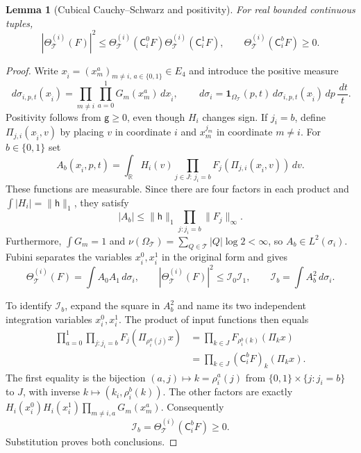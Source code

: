 \documentclass[12pt,reqno]{amsart}
\theoremstyle{plain}
\newtheorem{lemma}[theorem]{Lemma}
\theoremstyle{definition}
\theoremstyle{remark}
\numberwithin{equation}{section}
\newcommand{\R}{\mathbb R}
\newcommand{\T}{\mathcal T}
\newcommand{\g}{\mathsf g}
\newcommand{\h}{\mathsf h}
\newcommand{\dd}{\,d}
\newcommand{\one}{\mathbf 1}
\begin{document}
\begin{lemma}[Cubical Cauchy--Schwarz and positivity]\label{lem:cube_cs}
For real bounded continuous tuples,
\[
 |\Theta^{(i)}_\T(F)|^2\le
 \Theta^{(i)}_\T(\mathsf C_i^0F)\Theta^{(i)}_\T(\mathsf C_i^1F),
 \qquad \Theta^{(i)}_\T(\mathsf C_i^bF)\ge0.
\]
\end{lemma}
\begin{proof}
Write $x_{\widehat i}=(x_m^a)_{m\ne i,\,a\in\{0,1\}}\in E_4$
and introduce the positive measure
\[
 \dd\sigma_{i,p,t}(x_{\widehat i})
      =\prod_{m\ne i}\prod_{a=0}^1G_m(x_m^a)\dd x_{\widehat i},
 \qquad
 \dd\sigma_i=\one_{\Omega_\T}(p,t)
          \dd\sigma_{i,p,t}(x_{\widehat i})\dd p\,\frac{\dd t}{t}.
\]
Positivity follows from $\g\ge0$, even though $H_i$ changes sign.
If $j_i=b$, define $\Pi_{j,i}(x_{\widehat i},v)$ by placing $v$
in coordinate $i$ and $x_m^{j_m}$ in coordinate $m\ne i$.
For $b\in\{0,1\}$ set
\[
 A_b(x_{\widehat i},p,t)
 =\int_\R H_i(v)\prod_{j\in J:\,j_i=b}
                     F_j(\Pi_{j,i}(x_{\widehat i},v))\dd v.
\]
These functions are measurable. Since there are four factors in
each product and $\int|H_i|=\|\h\|_1$, they satisfy
\[
 |A_b|\le\|\h\|_1\prod_{j:j_i=b}\|F_j\|_\infty.
\]
Furthermore, $\int G_m=1$ and
$\nu(\Omega_\T)=\sum_{Q\in\T}|Q|\log2<\infty$, so
$A_b\in L^2(\sigma_i)$. Fubini separates the variables
$x_i^0,x_i^1$ in the original form and gives
\[
 \Theta^{(i)}_\T(F)
   =\int A_0A_1\dd\sigma_i,
 \qquad
 |\Theta^{(i)}_\T(F)|^2\le\mathcal I_0\mathcal I_1,
 \qquad \mathcal I_b=\int A_b^2\dd\sigma_i.
\]

To identify $\mathcal I_b$, expand the square in $A_b^2$ and name
its two independent integration variables $x_i^0,x_i^1$. The product
of input functions then equals
\begin{align*}
 \prod_{a=0}^1\prod_{j:j_i=b}
                  F_j(\Pi_{\rho_i^a(j)}x)
 &=\prod_{k\in J}F_{\rho_i^b(k)}(\Pi_kx)\\
 &=\prod_{k\in J}(\mathsf C_i^bF)_k(\Pi_kx).
\end{align*}
The first equality is the bijection
$(a,j)\mapsto k=\rho_i^a(j)$ from
$\{0,1\}\times\{j:j_i=b\}$ to $J$, with inverse
$k\mapsto(k_i,\rho_i^b(k))$. The other factors are exactly
$H_i(x_i^0)H_i(x_i^1)\prod_{m\ne i,a}G_m(x_m^a)$.
Consequently
\[
 \mathcal I_b=\Theta^{(i)}_\T(\mathsf C_i^bF)\ge0.
\]
Substitution proves both conclusions.
\end{proof}
\end{document}
